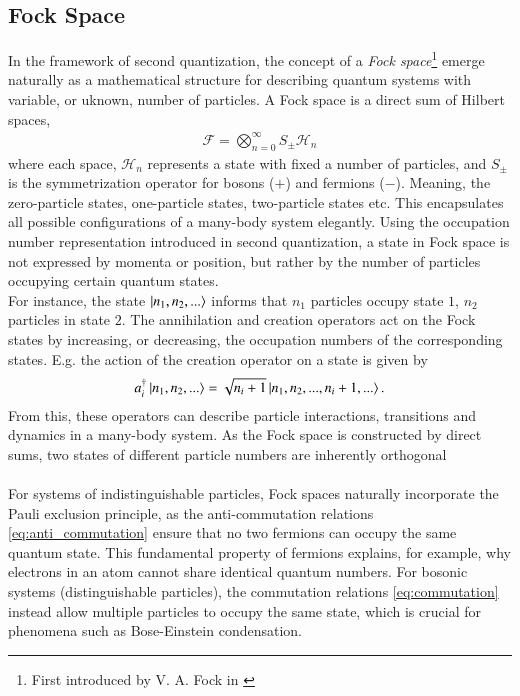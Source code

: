 \documentclass{subfiles}
\begin{document}
\subsection{Fock Space}
In the framework of second quantization, the concept of a \emph{Fock space}\footnote{First introduced by V. A. Fock in \cite{fock1932konfigurationsraum}} emerge naturally as a mathematical structure for describing quantum systems with variable, or uknown, number of particles. A Fock space is a direct sum of Hilbert spaces, 
\begin{align*}
    \mathcal{F} = \bigotimes_{n=0}^\infty S_{\pm} \mathcal{H}_n
\end{align*}
where each space, $\mathcal{H}_n$ represents a state with fixed a number of particles, and $S_{\pm}$ is the symmetrization operator for bosons ($+$) and fermions ($-$). Meaning, the zero-particle states, one-particle states, two-particle states etc. This encapsulates all possible configurations of a many-body system elegantly. Using the occupation number representation introduced in second quantization, a state in Fock space is not expressed by momenta or position, but rather by the number of particles occupying certain quantum states. \\
For instance, the state $\ket{n_1, n_2, ...}$ informs that $n_1$ particles occupy state $1$, $n_2$ particles  in state $2$. The annihilation and creation operators act on the Fock states by increasing, or decreasing, the occupation numbers of the corresponding states. E.g. the action of the creation operator on a state is given by
\begin{align*}
    a^\dagger_i\ket{n_1, n_2, ...} = \sqrt{n_i + 1}\ket{n_1, n_2, ..., n_i + 1, ...}.
\end{align*}
From this, these operators can describe particle interactions, transitions and dynamics in a many-body system. As the Fock space is constructed by direct sums, two states of different particle numbers are inherently orthogonal 
\\\\ 
For systems of indistinguishable particles, Fock spaces naturally incorporate the Pauli exclusion principle, as the anti-commutation relations \ref{eq:anti_commutation} ensure that no two fermions can occupy the same quantum state. This fundamental property of fermions explains, for example, why electrons in an atom cannot share identical quantum numbers. For bosonic systems (distinguishable particles), the commutation relations \ref{eq:commutation} instead allow multiple particles to occupy the same state, which is crucial for phenomena such as Bose-Einstein condensation.
\end{document}
